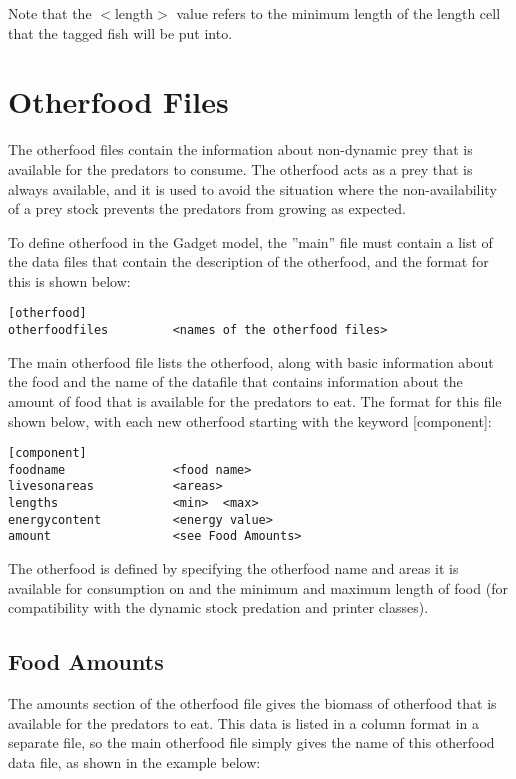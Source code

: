 \documentclass[10pt,twoside]{book}
\begin{document}
Note that the $<$length$>$ value refers to the minimum length of the length cell that the tagged fish will be put into.

\chapter{Otherfood Files}\label{chap:other}
The otherfood files contain the information about non-dynamic prey that is available for the predators to consume.  The otherfood acts as a prey that is always available, and it is used to avoid the situation where the non-availability of a prey stock prevents the predators from growing as expected.

\bigskip
To define otherfood in the Gadget model, the ''main'' file must contain a list of the data files that contain the description of the otherfood, and the format for this is shown below:

{\small\begin{verbatim}
[otherfood]
otherfoodfiles         <names of the otherfood files>
\end{verbatim}}

The main otherfood file lists the otherfood, along with basic information about the food and the name of the datafile that contains information about the amount of food that is available for the predators to eat.  The format for this file shown below, with each new otherfood starting with the keyword [component]:

{\small\begin{verbatim}
[component]
foodname               <food name>
livesonareas           <areas>
lengths                <min>  <max>
energycontent          <energy value>
amount                 <see Food Amounts>
\end{verbatim}}

The otherfood is defined by specifying the otherfood name and areas it is available for consumption on and the minimum and maximum length of food (for compatibility with the dynamic stock predation and printer classes).

\section{Food Amounts}\label{sec:foodamounts}
The amounts section of the otherfood file gives the biomass of otherfood that is available for the predators to eat.  This data is listed in a column format in a separate file, so the main otherfood file simply gives the name of this otherfood data file, as shown in the example below:
\end{document}
